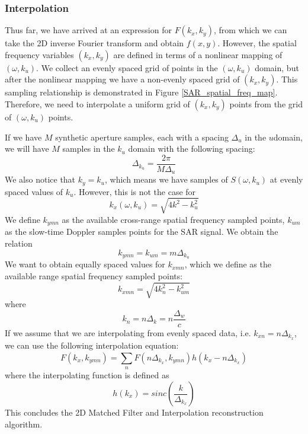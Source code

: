 \documentclass{article}
\begin{document}
\subsubsection*{Interpolation}
Thus far, we have arrived at an expression for \( F(k_{x} , k_{y}) \), from which we can take the 2D inverse Fourier transform and obtain \( f(x,y) \). However, the spatial frequency variables \( (k_{x}, k_{y}) \) are defined in terms of a nonlinear mapping of \((\omega , k_{u}) \). We collect an evenly spaced grid of points in the \((\omega , k_{u}) \) domain, but after the nonlinear mapping we have a non-evenly spaced grid of \( (k_{x}, k_{y}) \).
This sampling relationship is demonstrated in Figure \ref{SAR_spatial_freq_map}. Therefore, we need to interpolate a uniform grid of \( (k_{x}, k_{y}) \) points from the grid of \((\omega , k_{u}) \) points.

If we have \( M \) synthetic aperture samples, each with a spacing \( \Delta_{u} \) in the \( u \)domain, we will have \( M \) samples in the \( k_{u} \) domain with the following spacing:
\begin{displaymath}
	\Delta_{k_{u}} = \frac{2 \pi}{M \Delta_{u}} 	
\end{displaymath}
We also notice that \( k_{y} = k_{u} \), which means we have samples of \( S(\omega , k_{u}) \) at evenly spaced values of \( k_{u} \). However, this is not the case for
\begin{displaymath}
	k_{x}(\omega , k_{u}) = \sqrt{4 k^2 - k_{u}^2}
\end{displaymath}
We define \( k_{ymn} \) as the available cross-range spatial frequency sampled points, \( k_{um} \) as the slow-time Doppler samples points for the SAR signal. We obtain the relation
\begin{displaymath}
	k_{ymn} = k_{um} = m \Delta_{k_{u}}
\end{displaymath}
We want to obtain equally spaced values for \( k_{xmn} \), which we define as the available range spatial frequency sampled points:
\begin{displaymath}
	k_{xmn} = \sqrt{4 k_{n}^2 - k_{um}^2} 
\end{displaymath}
where
\begin{displaymath}
	k_{n} = n \Delta_{k} = n \frac{\Delta_{w}}{c} 
\end{displaymath}
If we assume that we are interpolating from evenly spaced data, i.e. \( k_{xn} = n \Delta_{k_{x}} \), we can use the following interpolation equation:
\begin{displaymath}
	F(k_{x} , k_{ymn}) = \sum\limits_{n}^{} F(n \Delta_{k_{x}} , k_{ymn}) h(k_{x} - n \Delta_{k_{x}}) 
\end{displaymath}
where the interpolating function is defined as
\begin{displaymath}
	h(k_{x}) = sinc \left( \frac{k}{\Delta_{k_{x}}} \right)
\end{displaymath}
This concludes the 2D Matched Filter and Interpolation reconstruction algorithm.
\end{document}
